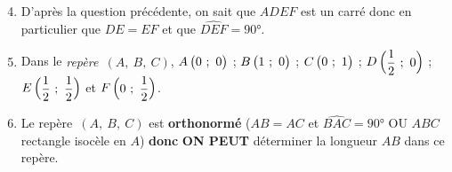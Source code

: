 \documentclass[a4paper,12pt,twocolumn,landscape]{article}
\newcommand{\rep}[3]{~$\left(#1,~#2,~#3\right)$}
\newcommand{\Fin}{node[xshift=-1.5ex,rotate=10]{F}
node[rotate=170]{i}
node[xshift=1.5ex,rotate=45]{n}}
\begin{document}
\begin{minipage}{0.45\textwidth}
\thispagestyle{firststyle}

\vspace*{1em}

\begin{enumerate}
	\setcounter{enumi}{3}
	\item D'après la question précédente, on sait que $ADEF$ est un carré donc en particulier que $DE = EF$ et que $\widehat{DEF} = 90°$.\\[1em]
	\item Dans le \emph{repère\rep{A}{B}{C}}, $A\begin{pmatrix}0~;~0\end{pmatrix}$ ; $B\begin{pmatrix}1~;~0\end{pmatrix}$ ; $C\begin{pmatrix}0~;~1\end{pmatrix}$ ; $D\begin{pmatrix}\dfrac{1}{2}~;~0\end{pmatrix}$ ; $E\begin{pmatrix}\dfrac{1}{2}~;~\dfrac{1}{2}\end{pmatrix}$ et $F\begin{pmatrix}0~;~\dfrac{1}{2}\end{pmatrix}$.
	\item Le repère\rep{A}{B}{C} est \textbf{orthonormé} ($AB = AC$ et $\widehat{BAC} = 90°$ OU $ABC$ rectangle isocèle en $A$) \textbf{donc} \textbf{ON PEUT} déterminer la longueur $AB$ dans ce repère.
\end{enumerate}



\vspace*{1em}
\centering
{}

\end{minipage}
\end{document}
